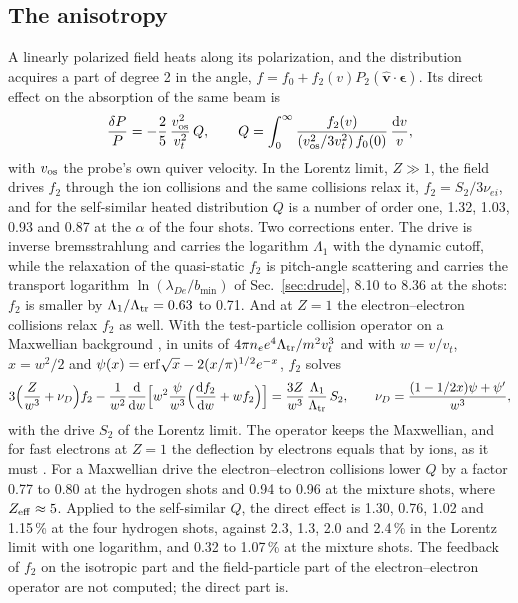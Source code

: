 \documentclass[11pt]{article}
\numberwithin{equation}{section}
\newcommand{\dd}{\mathrm d}
\newcommand{\vos}{v_{\rm os}}
\begin{document}
\subsection{The anisotropy}
\label{sec:aniso}
A linearly polarized field heats along its polarization, and the distribution acquires a
part of degree 2 in the angle, $f=f_0+f_2(v)P_2(\hat{\mathbf v}\cdot\boldsymbol\epsilon)$. Its direct
effect on the absorption of the same beam is
\begin{equation}
\frac{\delta P}{P}=-\frac25\,\frac{\vos^2}{v_t^2}\,Q,\qquad
Q=\int_0^\infty\frac{f_2(v)}{(\vos^2/3v_t^2)\,f_0(0)}\,\frac{\dd v}{v},
\label{eq:aniso}
\end{equation}
with $\vos$ the probe's own quiver velocity. In the Lorentz limit, $Z\gg1$, the field drives $f_2$
through the ion collisions and the same collisions relax it, $f_2=S_2/3\nu_{ei}$, and for the
self-similar heated distribution $Q$ is a number of order one, 1.32, 1.03, 0.93 and 0.87 at the
$\alpha$ of the four shots. Two corrections enter. The drive is inverse bremsstrahlung and carries
the logarithm $\Lambda_1$ with the dynamic cutoff, while the relaxation of the quasi-static $f_2$ is
pitch-angle scattering and carries the transport logarithm $\ln(\lambda_{De}/b_{\min})$ of Sec.~\ref{sec:drude}, 8.10 to
8.36 at the shots: $f_2$ is smaller by $\Lambda_1/\Lambda_{\rm tr}=0.63$ to 0.71. And at $Z=1$ the
electron--electron collisions relax $f_2$ as well. With the test-particle collision operator on a
Maxwellian background \cite{Rosenbluth1957}, in units of $4\pi n_ee^4\Lambda_{\rm tr}/m^2v_t^3$ and with
$w=v/v_t$, $x=w^2/2$ and $\psi(x)={\rm erf}\sqrt x-2(x/\pi)^{1/2}e^{-x}$, $f_2$ solves
\begin{equation}
3\Big(\frac{Z}{w^3}+\nu_D\Big)f_2-\frac{1}{w^2}\frac{\dd}{\dd w}\Big[w^2\frac{\psi}{w^3}\Big(\frac{\dd f_2}{\dd w}+wf_2\Big)\Big]
=\frac{3Z}{w^3}\,\frac{\Lambda_1}{\Lambda_{\rm tr}}\,S_2,\qquad
\nu_D=\frac{(1-1/2x)\psi+\psi'}{w^3},
\label{eq:f2ee}
\end{equation}
with the drive $S_2$ of the Lorentz limit. The operator keeps the Maxwellian, and for fast
electrons at $Z=1$ the deflection by electrons equals that by ions, as it must \cite{Spitzer1953}.
For a Maxwellian drive the electron--electron collisions lower $Q$ by a factor 0.77 to 0.80 at the
hydrogen shots and 0.94 to 0.96 at the mixture shots, where $Z_{\rm eff}\approx5$. Applied to the
self-similar $Q$, the direct effect is 1.30, 0.76, 1.02 and 1.15\,\% at the four hydrogen shots,
against 2.3, 1.3, 2.0 and 2.4\,\% in the Lorentz limit with one logarithm, and 0.32 to 1.07\,\% at the
mixture shots. The feedback of $f_2$ on the isotropic part and the field-particle part of the
electron--electron operator are not computed; the direct part is.
\end{document}
